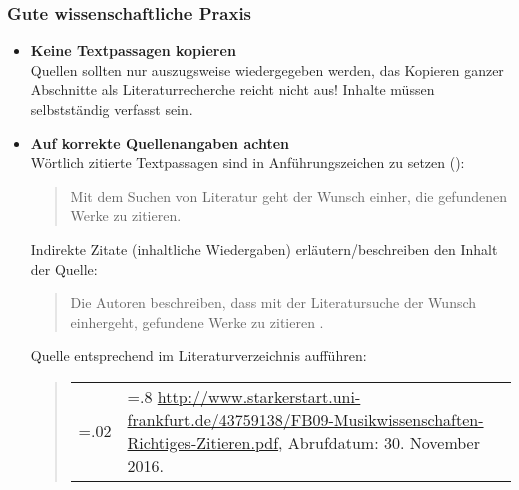 \subsubsection*{Gute wissenschaftliche Praxis}
\begin{itemize}
\item \textbf{Keine Textpassagen kopieren} \\
Quellen sollten nur auszugsweise wiedergegeben werden, das Kopieren ganzer Abschnitte als Literaturrecherche reicht nicht aus! Inhalte müssen selbstständig verfasst sein.
\item \textbf{Auf korrekte Quellenangaben achten} \\
Wörtlich zitierte Textpassagen sind in Anführungszeichen zu setzen (\glqq\grqq):
\begin{quote}
\glqq Mit dem Suchen von Literatur geht der Wunsch einher, die gefundenen Werke zu zitieren.\grqq\ \cite{cite}
\end{quote}
Indirekte Zitate (inhaltliche Wiedergaben) erläutern/beschreiben den Inhalt der Quelle:
\begin{quote}
Die Autoren beschreiben, dass mit der Literatursuche der Wunsch einhergeht, gefundene Werke zu zitieren \cite{cite}.
\end{quote}
Quelle entsprechend im Literaturverzeichnis aufführen:
\begin{quote}
\begin{tabularx}{\textwidth}{>{\hsize=.02\hsize}X>{\hsize=.8\hsize}X}
[1] & \url{http://www.starkerstart.uni-frankfurt.de/43759138/FB09-Musikwissenschaften-Richtiges-Zitieren.pdf}, Abrufdatum: 30. November 2016.
\end{tabularx}
\end{quote}
\end{itemize}
